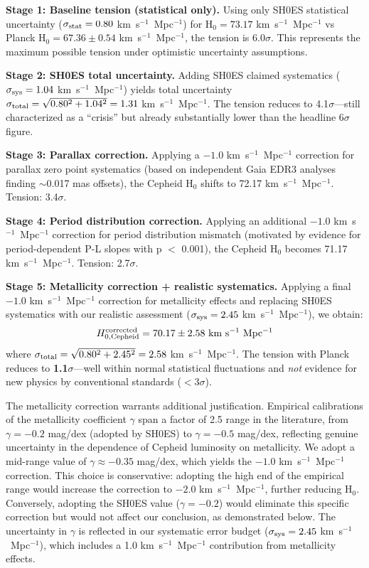 \documentclass[twocolumn, linenumbers]{aastex701}
\begin{document}
\textbf{Stage 1: Baseline tension (statistical only).} Using only SH0ES statistical uncertainty ($\sigma_{\rm stat} = 0.80$ km~s$^{-1}$~Mpc$^{-1}$) for H$_0 = 73.17$ km~s$^{-1}$~Mpc$^{-1}$ vs Planck H$_0 = 67.36 \pm 0.54$ km~s$^{-1}$~Mpc$^{-1}$, the tension is 6.0$\sigma$. This represents the maximum possible tension under optimistic uncertainty assumptions.

\textbf{Stage 2: SH0ES total uncertainty.} Adding SH0ES claimed systematics ($\sigma_{\rm sys} = 1.04$ km~s$^{-1}$~Mpc$^{-1}$) yields total uncertainty $\sigma_{\rm total} = \sqrt{0.80^2 + 1.04^2} = 1.31$ km~s$^{-1}$~Mpc$^{-1}$. The tension reduces to 4.1$\sigma$---still characterized as a ``crisis'' but already substantially lower than the headline 6$\sigma$ figure.

\textbf{Stage 3: Parallax correction.} Applying a $-1.0$ km~s$^{-1}$~Mpc$^{-1}$ correction for parallax zero point systematics (based on independent Gaia EDR3 analyses finding $\sim$0.017 mas offsets), the Cepheid H$_0$ shifts to 72.17 km~s$^{-1}$~Mpc$^{-1}$. Tension: 3.4$\sigma$.

\textbf{Stage 4: Period distribution correction.} Applying an additional $-1.0$ km~s$^{-1}$~Mpc$^{-1}$ correction for period distribution mismatch (motivated by evidence for period-dependent P-L slopes with p $<$ 0.001), the Cepheid H$_0$ becomes 71.17 km~s$^{-1}$~Mpc$^{-1}$. Tension: 2.7$\sigma$.

\textbf{Stage 5: Metallicity correction + realistic systematics.} Applying a final $-1.0$ km~s$^{-1}$~Mpc$^{-1}$ correction for metallicity effects and replacing SH0ES systematics with our realistic assessment ($\sigma_{\rm sys} = 2.45$ km~s$^{-1}$~Mpc$^{-1}$), we obtain:
\begin{equation}
H_{0,\rm Cepheid}^{\rm corrected} = 70.17 \pm 2.58~{\rm km~s^{-1}~Mpc^{-1}}
\end{equation}
where $\sigma_{\rm total} = \sqrt{0.80^2 + 2.45^2} = 2.58$ km~s$^{-1}$~Mpc$^{-1}$. The tension with Planck reduces to \textbf{1.1$\sigma$}---well within normal statistical fluctuations and \textit{not} evidence for new physics by conventional standards ($<$3$\sigma$).

The metallicity correction warrants additional justification. Empirical calibrations of the metallicity coefficient $\gamma$ span a factor of 2.5 range in the literature, from $\gamma = -0.2$ mag/dex (adopted by SH0ES) to $\gamma = -0.5$ mag/dex, reflecting genuine uncertainty in the dependence of Cepheid luminosity on metallicity. We adopt a mid-range value of $\gamma \approx -0.35$ mag/dex, which yields the $-1.0$ km~s$^{-1}$~Mpc$^{-1}$ correction. This choice is conservative: adopting the high end of the empirical range would increase the correction to $-2.0$ km~s$^{-1}$~Mpc$^{-1}$, further reducing H$_0$. Conversely, adopting the SH0ES value ($\gamma = -0.2$) would eliminate this specific correction but would not affect our conclusion, as demonstrated below. The uncertainty in $\gamma$ is reflected in our systematic error budget ($\sigma_{\rm sys} = 2.45$ km~s$^{-1}$~Mpc$^{-1}$), which includes a 1.0 km~s$^{-1}$~Mpc$^{-1}$ contribution from metallicity effects.
\end{document}

